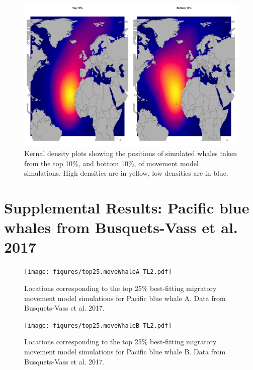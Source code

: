 \documentclass[a4paper,10pt]{article}
\begin{document}
\begin{landscape}
    \begin{figure}[!htbp]
    \centering
      \includegraphics[width=\linewidth]{figures/Figure-S8-kernals.png}
      \caption{Kernal density plots showing the positions of simulated whales taken from the top 10\%, and bottom 10\%, of movement model simulations. 
      High densities are in yellow, low densities are in blue.}
      \label{figs8}
  \end{figure}
\end{landscape}

\newpage
\section*{Supplemental Results: Pacific blue whales from Busquets-Vass et al. 2017}


\begin{landscape}
    \begin{figure}[!htbp]
    \centering
      \texttt{[image: figures/top25.moveWhaleA\_TL2.pdf]}
      \caption{Locations corresponding to the top 25\% best-fitting migratory movement model simulations for Pacific blue whale A. Data from Busquets-Vass et al. 2017.}
      \label{figwhaleA}
  \end{figure}
\end{landscape}

\begin{landscape}
    \begin{figure}[!htbp]
    \centering
      \texttt{[image: figures/top25.moveWhaleB\_TL2.pdf]}
      \caption{Locations corresponding to the top 25\% best-fitting migratory movement model simulations for Pacific blue whale B. Data from Busquets-Vass et al. 2017.}
      \label{figwhaleB}
  \end{figure}
\end{landscape}
\end{document}
